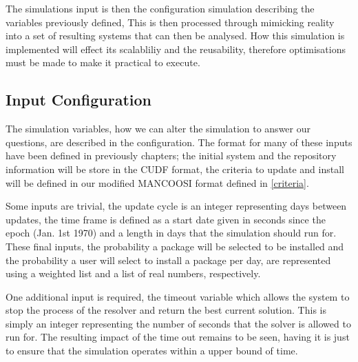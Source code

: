 The simulations input is then the configuration simulation describing the variables previously defined, 
This is then processed through mimicking reality into a set of resulting systems that can then be analysed.
How this simulation is implemented will effect its scalabliliy and the reusability, 
therefore optimisations must be made to make it practical to execute.

\subsection{Input Configuration}
The simulation variables, how we can alter the simulation to answer our questions, are described in the configuration.
The format for many of these inputs have been defined in previously chapters;
the initial system and the repository information will be store in the CUDF format, 
the criteria to update and install will be defined in our modified MANCOOSI format defined in \ref{criteria}.

Some inputs are trivial, 
the update cycle is an integer representing days between updates,
the time frame is defined as a start date given in seconds since the epoch (Jan. 1st 1970) and a length in days that the simulation should run for.
These final inputs, the probability a package will be selected to be installed and the probability a user will select to install a package per day,
are represented using a weighted list and a list of real numbers, respectively.

One additional input is required, the timeout variable which allows the system to stop the process of the resolver and return the best current solution.
This is simply an integer representing the number of seconds that the solver is allowed to run for.
The resulting impact of the time out remains to be seen, having it is just to ensure that the simulation operates within a upper bound of time.

